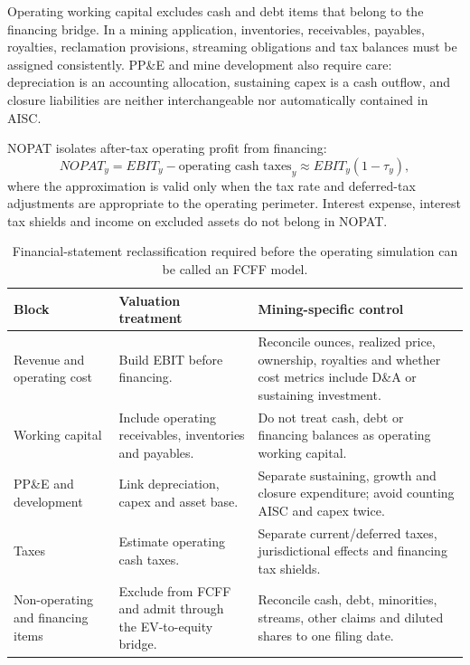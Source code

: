 Operating working capital excludes cash and debt items that belong to the
financing bridge. In a mining application, inventories, receivables, payables,
royalties, reclamation provisions, streaming obligations and tax balances
must be assigned consistently. PP\&E and mine development also require care:
depreciation is an accounting allocation, sustaining capex is a cash outflow,
and closure liabilities are neither interchangeable nor automatically
contained in AISC.

NOPAT isolates after-tax operating profit from financing:
\begin{equation}
NOPAT_y=EBIT_y-\text{operating cash taxes}_y
       \approx EBIT_y(1-\tau_y),
\end{equation}
where the approximation is valid only when the tax rate and deferred-tax
adjustments are appropriate to the operating perimeter. Interest expense,
interest tax shields and income on excluded assets do not belong in NOPAT.

\begin{table}[H]
\centering
\small
\renewcommand{\arraystretch}{1.10}
\begin{tabularx}{\textwidth}{@{}p{3.0cm}p{4.2cm}X@{}}
\toprule
Block & Valuation treatment & Mining-specific control \\
\midrule
Revenue and operating cost & Build EBIT before financing. & Reconcile ounces,
realized price, ownership, royalties and whether cost metrics include D\&A or
sustaining investment. \\
Working capital & Include operating receivables, inventories and payables. &
Do not treat cash, debt or financing balances as operating working capital. \\
PP\&E and development & Link depreciation, capex and asset base. & Separate
sustaining, growth and closure expenditure; avoid counting AISC and capex
twice. \\
Taxes & Estimate operating cash taxes. & Separate current/deferred taxes,
jurisdictional effects and financing tax shields. \\
Non-operating and financing items & Exclude from FCFF and admit through the
EV-to-equity bridge. & Reconcile cash, debt, minorities, streams, other claims
and diluted shares to one filing date. \\
\bottomrule
\end{tabularx}
\caption{Financial-statement reclassification required before the operating
simulation can be called an FCFF model.}
\label{tab:dcf-reclassification}
\end{table}

